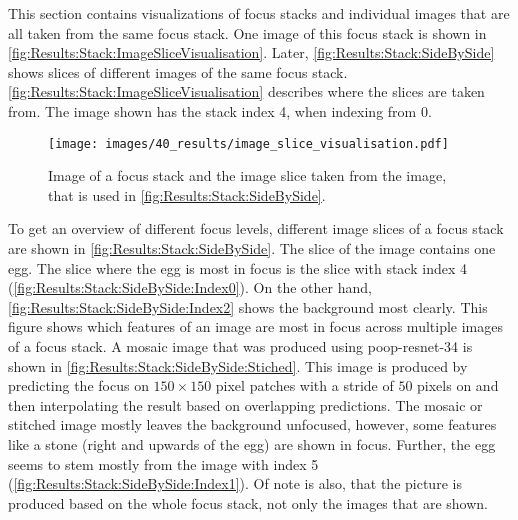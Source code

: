 This section contains visualizations of focus stacks and individual images that are all taken from the same focus stack. One image of this focus stack is shown in \autoref{fig:Results:Stack:ImageSliceVisualisation}. Later, \autoref{fig:Results:Stack:SideBySide} shows slices of different images of the same focus stack. \autoref{fig:Results:Stack:ImageSliceVisualisation} describes where the slices are taken from. The image shown has the stack index 4, when indexing from 0.

\begin{figure}
    \centering
    \texttt{[image: images/40\_results/image\_slice\_visualisation.pdf]}
    \caption[Example focus stack image]{Image of a focus stack and the image slice taken from the image, that is used in \autoref{fig:Results:Stack:SideBySide}.}
    \label{fig:Results:Stack:ImageSliceVisualisation}
\end{figure}


To get an overview of different focus levels, different image slices of a focus stack are shown in \autoref{fig:Results:Stack:SideBySide}. The slice of the image contains one egg. The slice where the egg is most in focus is the slice with stack index 4 (\autoref{fig:Results:Stack:SideBySide:Index0}). On the other hand, \autoref{fig:Results:Stack:SideBySide:Index2} shows the background most clearly. This figure shows which features of an image are most in focus across multiple images of a focus stack. A mosaic image that was produced using \acs{poop}-\acs{resnet}-34 is shown in \autoref{fig:Results:Stack:SideBySide:Stiched}. This image is produced by predicting the focus on $150 \times 150$ pixel patches with a stride of $50$ pixels on and then interpolating the result based on overlapping predictions. The mosaic or stitched image mostly leaves the background unfocused, however, some features like a stone (right and upwards of the egg) are shown in focus. Further, the egg seems to stem mostly from the image with index 5 (\autoref{fig:Results:Stack:SideBySide:Index1}). Of note is also, that the picture is produced based on the whole focus stack, not only the images that are shown.


